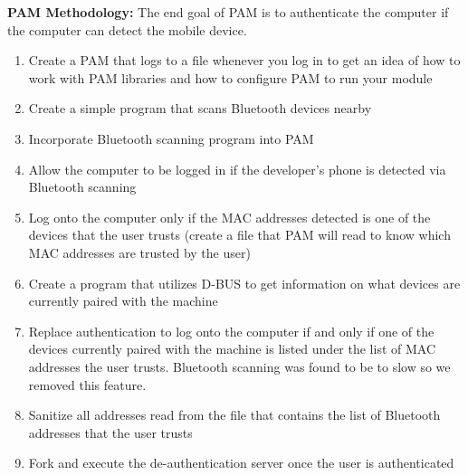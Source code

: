 \documentclass[letterpaper,twocolumn,10pt]{article}
\begin{document}
\textbf{PAM Methodology:} The end goal of PAM is to authenticate the computer if the computer can detect the mobile device.
\begin{enumerate}
\item Create a PAM that logs to a file whenever you log in to get an idea of how to work with PAM libraries and how to configure PAM to run your module
\item Create a simple program that scans Bluetooth devices nearby
\item Incorporate Bluetooth scanning program into PAM
\item Allow the computer to be logged in if the developer's phone is detected via Bluetooth scanning
\item Log onto the computer only if the MAC addresses detected is one of the devices that the user trusts (create a file that PAM will read to know which MAC addresses are trusted by the user)
\item Create a program that utilizes D-BUS to get information on what devices are currently paired with the machine
\item Replace authentication to log onto the computer if and only if one of the devices currently paired with the machine is listed under the list of MAC addresses the user trusts. Bluetooth scanning was found to be to slow so we removed this feature.
\item Sanitize all addresses read from the file that contains the list of Bluetooth addresses that the user trusts
\item Fork and execute the de-authentication server once the user is authenticated
\end{enumerate}

\hrulefill
\end{document}
